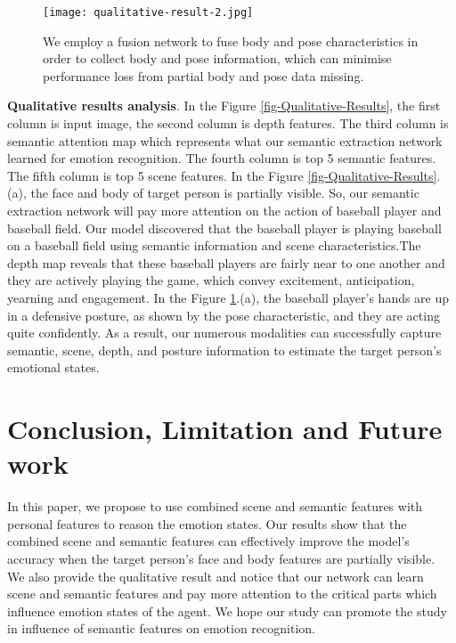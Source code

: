 \documentclass[conference]{IEEEtran}
\begin{document}
\begin{figure}[h!]
\centering
  \texttt{[image: qualitative-result-2.jpg]}
  \caption{We employ a  fusion network to fuse body and pose characteristics in order to collect body and pose information, which can minimise performance loss from partial body and pose data missing.}
  \label{fig-scene-semantic}
\end{figure}

\textbf{Qualitative results analysis}. In the Figure \ref{fig-Qualitative-Results}, the first column is input image, the second column is depth features. The third column is semantic attention map which represents what our semantic extraction network learned for emotion recognition. The fourth column is top 5 semantic features. The fifth column is top 5 scene features. In the Figure \ref{fig-Qualitative-Results}.(a), the face and body of target person is partially visible. So, our semantic extraction network will pay more attention on the action of baseball player and baseball field. Our model discovered that the baseball player is playing baseball on a baseball field using semantic information and scene characteristics.The depth map reveals that these baseball players are fairly near to one another and they are actively playing the game, which convey  excitement, anticipation, yearning and  engagement. In the Figure \ref{fig-scene-semantic}.(a), the baseball player's hands are up in a defensive posture, as shown by the pose characteristic, and they are acting quite confidently. As a result, our numerous modalities can successfully capture semantic, scene, depth, and posture information to estimate the target person's emotional states.

\section{Conclusion, Limitation and Future work}
\label{sec:conclusion}
In this paper, we propose to use combined scene and semantic features with personal features to reason the emotion states.  Our results show that the combined scene and semantic features can effectively improve the model’s accuracy when the target person’s face and body features are partially visible. We also provide the qualitative result and notice that our network can learn scene and semantic features and pay more attention to the critical parts which influence emotion states of the agent. We hope our study can promote the study in influence of semantic features on emotion recognition. 
\end{document}

